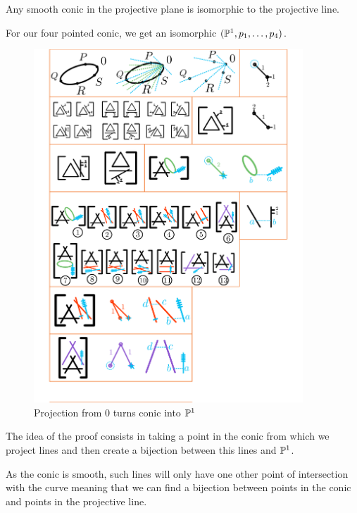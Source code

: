 \documentclass[12pt]{memoir}
\begin{document}
\begin{Prop}%
    Any smooth conic in the projective plane is isomorphic to the projective line.
\end{Prop}

For our four pointed conic, we get an isomorphic $(\mathbb{P}^1,p_1,\dots,p_4)$. 

\begin{figure}[h!]
        \centering
        \includegraphics[width=0.9\textwidth, trim= 1.32cm 24.6cm 5.2cm 0.1cm,clip]{../figs/FigsDNnotability3.pdf}
        \caption{Projection from $0$ turns conic into $\mathbb{P}^1$}
        \label{fig:smooth-conic-into-P1}
    \end{figure}
\begin{ptcb}

    The idea of the proof consists in taking a point in the conic from which we project lines and then create a bijection between this lines and $\mathbb{P}^1$.\par
    As the conic is smooth, such lines will only have one other point of intersection with the curve meaning that we can find a bijection between points in the conic and points in the projective line.
\end{ptcb}
\end{document}
